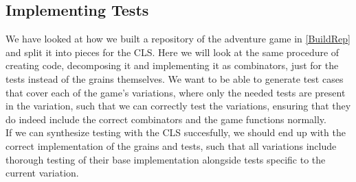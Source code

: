 \subsection{Implementing Tests}
We have looked at how we built a repository of the adventure game in \autoref{BuildRep} and split it into pieces for the CLS. Here we will look at the same procedure of creating code, decomposing it and implementing it as combinators, just for the tests instead of the grains themselves. We want to be able to generate test cases that cover each of the game's variations, where only the needed tests are present in the variation, such that we can correctly test the variations, ensuring that they do indeed include the correct combinators and the game functions normally. \\
If we can synthesize testing with the CLS succesfully, we should end up with the correct implementation of the grains and tests, such that all variations include thorough testing of their base implementation alongside tests specific to the current variation.  






